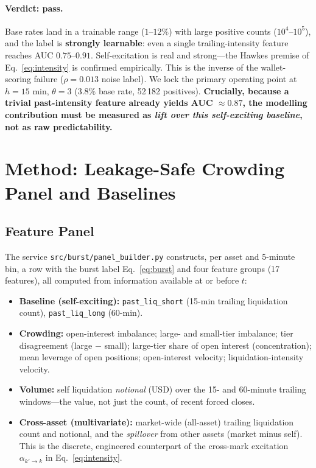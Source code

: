\documentclass[11pt,a4paper]{article}
\begin{document}
\paragraph{Verdict: pass.} Base rates land in a trainable range ($1$--$12\%$) with large positive counts ($10^4$--$10^5$), and the label is \textbf{strongly learnable}: even a single trailing-intensity feature reaches AUC $0.75$--$0.91$. Self-excitation is real and strong---the Hawkes premise of Eq.~\eqref{eq:intensity} is confirmed empirically. This is the inverse of the wallet-scoring failure ($\rho=0.013$ noise label). We lock the primary operating point at $h=15$ min, $\theta=3$ ($3.8\%$ base rate, 52\,182 positives). \textbf{Crucially, because a trivial past-intensity feature already yields AUC $\approx 0.87$, the modelling contribution must be measured as \emph{lift over this self-exciting baseline}, not as raw predictability.}

\section{Method: Leakage-Safe Crowding Panel and Baselines}

\subsection{Feature Panel}

The service \texttt{src/burst/panel\_builder.py} constructs, per asset and 5-minute bin, a row with the burst label Eq.~\eqref{eq:burst} and four feature groups (17 features), all computed from information available at or before $t$:

\begin{itemize}[nosep]
    \item \textbf{Baseline (self-exciting):} \texttt{past\_liq\_short} (15-min trailing liquidation count), \texttt{past\_liq\_long} (60-min).
    \item \textbf{Crowding:} open-interest imbalance; large- and small-tier imbalance; tier disagreement (large $-$ small); large-tier share of open interest (concentration); mean leverage of open positions; open-interest velocity; liquidation-intensity velocity.
    \item \textbf{Volume:} self liquidation \emph{notional} (USD) over the 15- and 60-minute trailing windows---the value, not just the count, of recent forced closes.
    \item \textbf{Cross-asset (multivariate):} market-wide (all-asset) trailing liquidation count and notional, and the \emph{spillover} from other assets (market minus self). This is the discrete, engineered counterpart of the cross-mark excitation $\alpha_{k'\to k}$ in Eq.~\eqref{eq:intensity}.
\end{itemize}
\end{document}

